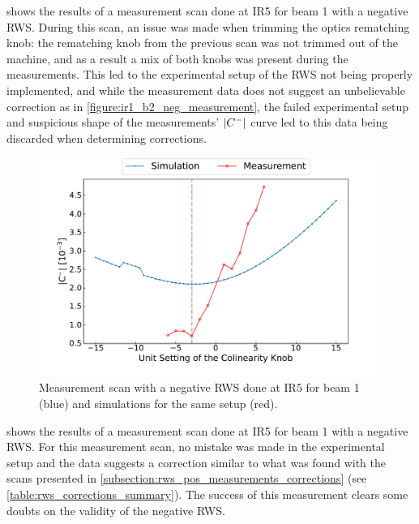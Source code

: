  shows the results of a measurement scan done at IR\num{5} for beam \num{1} with a negative RWS.
During this scan, an issue was made when trimming the optics rematching knob: the rematching knob from the previous scan was not trimmed out of the machine, and as a result a mix of both knobs was present during the measurements.
This led to the experimental setup of the RWS not being properly implemented, and while the measurement data does not suggest an unbelievable correction as in \cref{figure:ir1_b2_neg_measurement}, the failed experimental setup and suspicious shape of the measurements' \(\left\lvert C^{-} \right\rvert\) curve led to this data being discarded when determining corrections.

\begin{figure}[!htb]
    \centering
    \includegraphics*[width=\textwidth]{Figures/Appendices/rws_measurement_ir5_b1_neg.pdf}
    \caption{Measurement scan with a negative RWS done at IR\num{5} for beam \num{1} (\textcolor{mplblue}{blue}) and simulations for the same setup (\textcolor{mplr}{red}).}
    \label{figure:ir5_b1_neg_measurement}
\end{figure}

 shows the results of a measurement scan done at IR\num{5} for beam \num{1} with a negative RWS.
For this measurement scan, no mistake was made in the experimental setup and the data suggests a correction similar to what was found with the scans presented in \cref{subsection:rws_pos_measurements_corrections} (see \cref{table:rws_corrections_summary}).
The success of this measurement clears some doubts on the validity of the negative \gls{RWS}.

